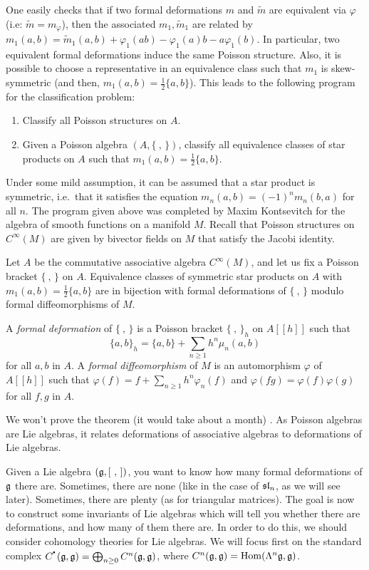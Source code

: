    One easily checks that if two formal deformations $m$ and $\tilde m$ are equivalent
   via $\varphi$ (i.e: $\tilde m=m_\varphi$), then the associated $m_1,\tilde m_1$ are
   related by $m_1(a,b) = \tilde m_1(a,b)+\varphi_1(ab)-\varphi_1(a)b-a\varphi_1(b)$.
   In particular, two equivalent formal deformations induce the same Poisson
   structure. Also, it is possible to choose a representative in an equivalence class
   such that $m_1$ is skew-symmetric (and then, $m_1(a,b)=\frac{1}{2}\{a,b\}$). This
   leads to the following program for the classification problem:
   \begin{enumerate}
   \item Classify all Poisson structures on $A$.

   \item Given a Poisson algebra $(A,\{\ ,\,\})$, classify all equivalence
   classes of star products on $A$ such that $m_1(a,b)=\frac{1}{2}\{a,b\}$.
   \end{enumerate}

   Under some mild assumption, it can be assumed that a star product is symmetric,
   i.e.\ that it satisfies the equation $m_n(a,b)=(-1)^n m_n(b,a)$ for all $n$. The
   program given above was completed by Maxim Kontsevitch 
   for the algebra of smooth functions on a manifold $M$. Recall that Poisson
   structures on $C^\infty(M)$ are given by bivector fields on $M$ that satisfy the
   Jacobi identity.

  \begin{theorem}[Kontsevich, 1994]
  Let $A$ be the commutative associative algebra $C^\infty(M)$, and let us fix a
  Poisson bracket $\{\ ,\,\}$ on $A$. Equivalence classes of symmetric star products
  on $A$ with $m_1(a,b)=\frac{1}{2}\{a,b\}$ are in bijection with formal deformations
  of $\{\ ,\,\}$ modulo formal diffeomorphisms of $M$.
  \end{theorem}
  A \emph{formal deformation} of $\{\ ,\,\}$ is a Poisson bracket $\{\ ,\,\}_h$ on $A[[h]]$
  such that
  \[
    \{a,b\}_h = \{a,b\} + \sum_{n\ge 1} h^n \mu_n(a,b)
  \]
  for all $a,b$ in $A$. A \emph{formal diffeomorphism} of $M$ is an automorphism
  $\varphi$ of $A[[h]]$ such that $\varphi(f) = f+\sum_{n\ge 1} h^n \varphi_n(f)$
  and $\varphi(fg)=\varphi(f)\varphi(g)$ for all $f,g$ in $A$.

  We won't prove the theorem (it would take about a month) .
  As Poisson algebras are Lie algebras, it relates deformations of associative
  algebras to deformations of Lie algebras.

  Given a Lie algebra $(\g, [\ ,\,])$, you want to know how many formal deformations
  of $\g$ there are. Sometimes, there are none (like in the case of $\sl_n$, as we
  will see later). Sometimes, there are plenty (as for triangular matrices). The
  goal is now to construct some invariants of Lie algebras which will tell you whether
  there are deformations, and how many of them there are. In order to do this, we
  should consider cohomology theories for Lie algebras. We will focus first on the
  standard complex $C^\udot (\g,\g) = \bigoplus_{n\ge 0} C^n(\g,\g)$, where
  $C^n(\g,\g) = \hom(\Lambda^n \g,\g)$.
